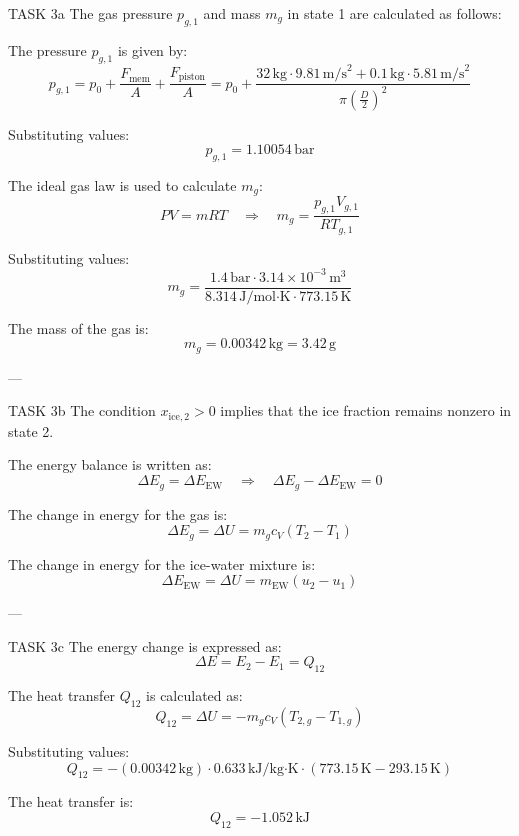 TASK 3a  
The gas pressure \( p_{g,1} \) and mass \( m_g \) in state 1 are calculated as follows:  

The pressure \( p_{g,1} \) is given by:  
\[
p_{g,1} = p_0 + \frac{F_{\text{mem}}}{A} + \frac{F_{\text{piston}}}{A} = p_0 + \frac{32 \, \text{kg} \cdot 9.81 \, \text{m/s}^2 + 0.1 \, \text{kg} \cdot 5.81 \, \text{m/s}^2}{\pi \left(\frac{D}{2}\right)^2}
\]  

Substituting values:  
\[
p_{g,1} = 1.10054 \, \text{bar}
\]  

The ideal gas law is used to calculate \( m_g \):  
\[
PV = mRT \quad \Rightarrow \quad m_g = \frac{p_{g,1} V_{g,1}}{R T_{g,1}}
\]  

Substituting values:  
\[
m_g = \frac{1.4 \, \text{bar} \cdot 3.14 \times 10^{-3} \, \text{m}^3}{8.314 \, \text{J/mol·K} \cdot 773.15 \, \text{K}}
\]  

The mass of the gas is:  
\[
m_g = 0.00342 \, \text{kg} = 3.42 \, \text{g}
\]  

---

TASK 3b  
The condition \( x_{\text{ice},2} > 0 \) implies that the ice fraction remains nonzero in state 2.  

The energy balance is written as:  
\[
\Delta E_g = \Delta E_{\text{EW}} \quad \Rightarrow \quad \Delta E_g - \Delta E_{\text{EW}} = 0
\]  

The change in energy for the gas is:  
\[
\Delta E_g = \Delta U = m_g c_V (T_2 - T_1)
\]  

The change in energy for the ice-water mixture is:  
\[
\Delta E_{\text{EW}} = \Delta U = m_{\text{EW}} (u_2 - u_1)
\]  

---

TASK 3c  
The energy change is expressed as:  
\[
\Delta E = E_2 - E_1 = Q_{12}
\]  

The heat transfer \( Q_{12} \) is calculated as:  
\[
Q_{12} = \Delta U = -m_g c_V (T_{2,g} - T_{1,g})
\]  

Substituting values:  
\[
Q_{12} = -(0.00342 \, \text{kg}) \cdot 0.633 \, \text{kJ/kg·K} \cdot (773.15 \, \text{K} - 293.15 \, \text{K})
\]  

The heat transfer is:  
\[
Q_{12} = -1.052 \, \text{kJ}
\]  